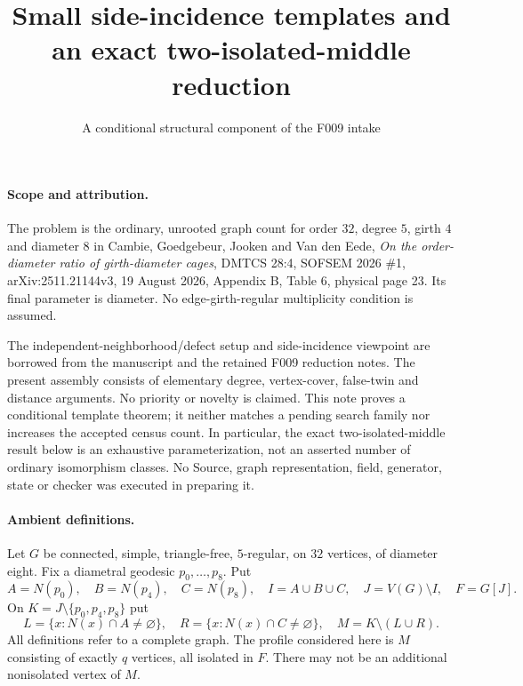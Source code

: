 \documentclass[11pt]{article}
\title{Small side-incidence templates and an exact two-isolated-middle reduction}
\author{A conditional structural component of the F009 intake}
\date{}
\begin{document}
\maketitle

\paragraph{Scope and attribution.}
The problem is the ordinary, unrooted graph count for order $32$, degree
$5$, girth $4$ and diameter $8$ in Cambie, Goedgebeur, Jooken and
Van den Eede, \emph{On the order-diameter ratio of girth-diameter cages},
DMTCS 28:4, SOFSEM 2026 \#1, arXiv:2511.21144v3, 19 August 2026,
Appendix B, Table 6, physical page 23. Its final parameter is diameter.
No edge-girth-regular multiplicity condition is assumed.

The independent-neighborhood/defect setup and side-incidence viewpoint
are borrowed from the manuscript and the retained F009 reduction notes.
The present assembly consists of elementary degree, vertex-cover,
false-twin and distance arguments. No priority or novelty is claimed.
This note proves a conditional template theorem; it neither matches a
pending search family nor increases the accepted census count. In
particular, the exact two-isolated-middle result below is an exhaustive
parameterization, not an asserted number of ordinary isomorphism classes.
No Source, graph representation, field, generator, state or checker was
executed in preparing it.

\paragraph{Ambient definitions.}
Let $G$ be connected, simple, triangle-free, $5$-regular, on $32$
vertices, of diameter eight. Fix a diametral geodesic $p_0,\ldots,p_8$.
Put
\[
 A=N(p_0),\quad B=N(p_4),\quad C=N(p_8),\quad I=A\cup B\cup C,
 \quad J=V(G)\setminus I,\quad F=G[J].
\]
On $K=J\setminus\{p_0,p_4,p_8\}$ put
\[
 L=\{x:N(x)\cap A\ne\varnothing\},\quad
 R=\{x:N(x)\cap C\ne\varnothing\},\quad M=K\setminus(L\cup R).
\]
All definitions refer to a complete graph. The profile considered here
is $M$ consisting of exactly $q$ vertices, all isolated in $F$.
There may not be an additional nonisolated vertex of $M$.
\end{document}
